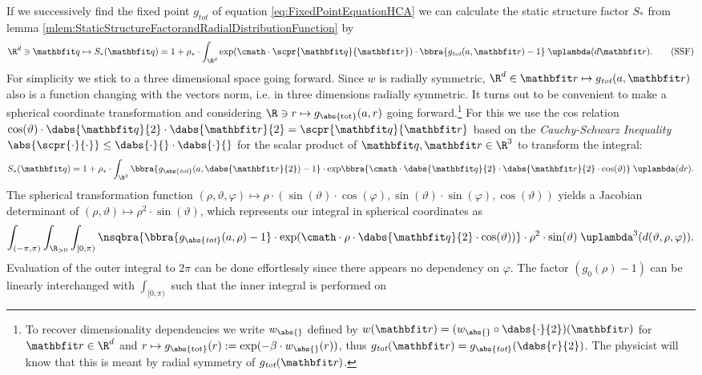If we successively find the fixed point $g_{\textit{tot}}$ of equation \eqref{eq:FixedPointEquationHCA} we can calculate the static structure factor $S_*$ from lemma \ref{mlem:StaticStructureFactorandRadialDistributionFunction} by
\begin{align}
    \R^d\ni \vq\mapsto S_*(\vq) = 1 + \rho_*\cdot\int_{\R^d}\exp(\cmath\cdot\scpr{\vq}{\vr})\cdot\bbra{g_{\textit{tot}}(a,\vr) - 1}\;\uplambda(d\vr). \label{eq:StaticStructureFactorHCA}\tag{SSF}
\end{align}
For simplicity we stick to a three dimensional space going forward. Since $w$ is radially symmetric, $\R^d\in \vr\mapsto g_{\textit{tot}}(a,\vr)$ also is a function changing with the vectors norm, i.e. in three dimensions radially symmetric. It turns out to be convenient to make a spherical coordinate transformation and considering $\R\ni r\mapsto g_{\abs{\text{tot}}}(a,r)$ going forward.\footnote{To recover dimensionality dependencies we write $w_\abs{}$ defined by $w(\vr) = (w_{\abs{}}\circ\dabs{\cdot}{2})(\vr)$ for $\vr\in\R^d$ and $r\mapsto g_{\abs{\text{tot}}}(r):=\exp(-\beta\cdot w_{\abs{}}(r))$, thus $g_{\textit{tot}}(\vr) = g_{\abs{\textit{tot}}}(\dabs{r}{2})$. The physicist will know that this is meant by radial symmetry of $g_{\textit{tot}}(\vr)$.} For this we use the cos relation $\cos(\vartheta)\cdot\dabs{\vq}{2}\cdot\dabs{\vr}{2} = \scpr{\vq}{\vr}$ based on the \emph{Cauchy-Schwarz Inequality} $\abs{\scpr{\cdot}{\cdot}}\leq\dabs{\cdot}{}\cdot\dabs{\cdot}{}$ for the scalar product of $\vq,\vr\in\R^3$ to transform the integral:
\[
    S_*(\vq) = 1 + \rho_*\cdot\int_{\R^3}\bbra{g_{\abs{\textit{tot}}}(a,\dabs{\vr}{2}) - 1}\cdot{\exp}\bbra{\cmath\cdot\dabs{\vq}{2}\cdot\dabs{\vr}{2}\cdot\cos(\vartheta)}\;\uplambda(dr).
\]
The spherical transformation function $(\rho,\vartheta,\varphi)\mapsto \rho\cdot (\sin(\vartheta)\cdot\cos(\varphi),\sin(\vartheta)\cdot\sin(\varphi),\cos(\vartheta))$ yields a Jacobian determinant of $(\rho,\vartheta)\mapsto \rho^2\cdot\sin(\vartheta)$, which represents our integral in spherical coordinates as
\[
    \int_{(-\pi,\pi)}\int_{\R_{>0}}\int_{[0,\pi)}\nsqbra{\bbra{g_{\abs{\textit{tot}}}(a,\rho) - 1}\cdot\exp(\cmath\cdot\rho\cdot\dabs{\vq}{2}\cdot\cos(\vartheta))}\cdot\rho^2\cdot\sin(\vartheta)\;\uplambda^3(d(\vartheta,\rho,\varphi)).
\]
Evaluation of the outer integral to $2\pi$ can be done effortlessly since there appears no dependency on $\varphi$. The factor $(g_0(\rho) - 1)$ can be linearly interchanged with $\int_{[0,\pi)}$ such that the inner integral is performed on 
